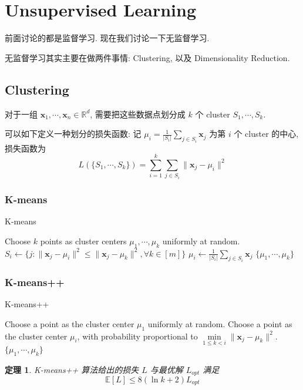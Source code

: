 \documentclass[8pt]{article}
\theoremstyle{compact}
\newtheorem{theorem}{定理}[section]
\def\le{\leqslant}
\def\E#1{\mathbb{E}\left[{#1}\right]}
\begin{document}
\newpage
\section{Unsupervised Learning}

前面讨论的都是监督学习. 现在我们讨论一下无监督学习.

无监督学习其实主要在做两件事情: Clustering, 以及 Dimensionality Reduction.

\subsection{Clustering}
对于一组 $\mathbf x_1, \cdots, \mathbf x_n \in \mathbb R^d$, 需要把这些数据点划分成 $k$ 个 cluster $S_1, \cdots, S_k$.

可以如下定义一种划分的损失函数: 记 $\mu_i = \frac{1}{|S_i|}\sum_{j \in S_i}\mathbf x_j$ 为第 $i$ 个 cluster 的中心, 损失函数为 $$L(\{S_1, \cdots, S_k\}) = \sum_{i=1}^{k}\sum_{j \in S_i} \| \mathbf x_j - \mu_i \|^2$$

\subsubsection{K-means}
\begin{algorithm}
	\caption{K-means}
	\begin{algorithmic}[1]
		\State Choose $k$ points as cluster centers $\mu_1, \cdots, \mu_k$ uniformly at random.
		\Repeat
			\State $S_i \gets \{j : \|\mathbf x_j - \mu_i\|^2 \le \|\mathbf x_j - \mu_k\|^2, \forall k \in [m]\}$
			\State $\mu_i \gets \frac{1}{|S_i|} \sum_{j \in S_i} \mathbf x_j$
		\State \Return $\{\mu_1, \cdots, \mu_k\}$
	\end{algorithmic}
\end{algorithm}

\subsubsection{K-means++}
\begin{algorithm}
	\caption{K-means++}
	\begin{algorithmic}[1]
		\State 	Choose a point as the cluster center $\mu_1$ uniformly at random.
			\State Choose a point as the cluster center $\mu_i$, with probability proportional to $\min\limits_{1 \le k < i}\|\mathbf x_j - \mu_k\|^2$.
		\EndFor
		\State \Return $\{\mu_1, \cdots, \mu_k\}$
	\end{algorithmic}
\end{algorithm}
\begin{theorem}
	K-means++ 算法给出的损失 $L$ 与最优解 $L_{opt}$ 满足 $$\E{L} \le 8(\ln k + 2)L_{opt}$$
\end{theorem}
\end{document}
